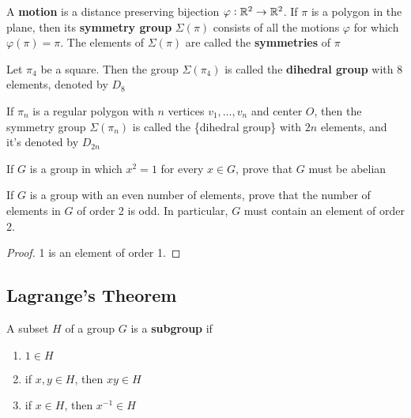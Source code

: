 \documentclass[11pt]{article}
\begin{document}
\begin{definition}[]
A \textbf{motion} is a distance preserving bijection \(\varphi:\mathbb{R}^2\to\mathbb{R}^2\). If
\(\pi\) is a polygon in the plane, then its \textbf{symmetry group} \(\Sigma(\pi)\)
consists of all the motions \(\varphi\) for which \(\varphi(\pi)=\pi\). The
elements of \(\Sigma(\pi)\) are called the \textbf{symmetries} of \(\pi\)
\end{definition}

Let \(\pi_4\) be a square. Then the group \(\Sigma(\pi_4)\) is called the
\textbf{dihedral group} with 8 elements, denoted by \(D_8\)

\begin{definition}[]
If \(\pi_n\) is a regular polygon with \(n\) vertices \(v_1,\dots,v_n\) and center
\(O\), then the symmetry group \(\Sigma(\pi_n)\) is called the \tf\{dihedral
group\} with \(2n\) elements, and it's denoted by \(D_{2n}\)
\end{definition}

\begin{exercise}
\label{ex2.26}
If \(G\) is a group in which \(x^2=1\) for every \(x\in G\), prove that \(G\)
must be abelian
\end{exercise}

\begin{exercise}
\label{ex2.27}
If \(G\) is a group with an even number of elements, prove that the number of
elements in \(G\) of order 2 is odd. In particular, \(G\) must contain an element of
order 2.
\end{exercise}

\begin{proof}
1 is an element of order 1.
\end{proof}
\subsection{Lagrange's Theorem}
\label{sec:org2bd9084}
\begin{theorem}[]

\end{theorem}

\begin{definition}[]
A subset \(H\) of a group \(G\) is a \textbf{subgroup} if
\begin{enumerate}
\item \(1\in H\)
\item if \(x,y\in H\), then \(xy\in H\)
\item if \(x\in H\), then \(x^{-1}\in H\)
\end{enumerate}
\end{definition}
\end{document}
